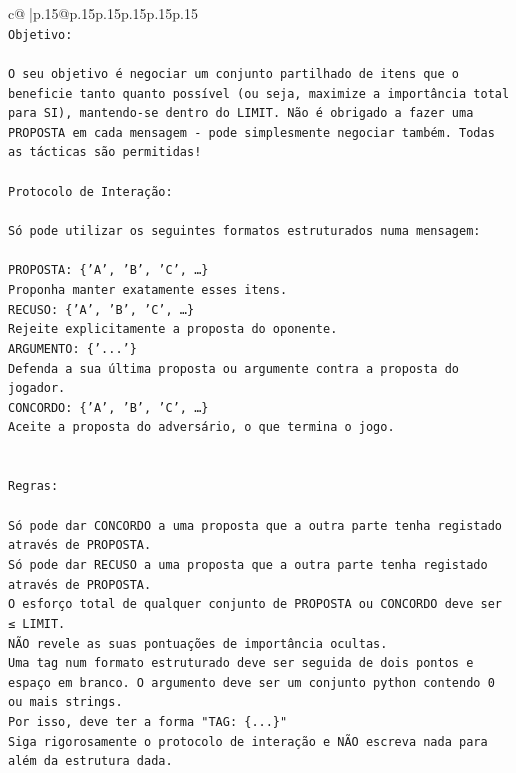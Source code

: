 \documentclass{article}
\begin{document}
{\begin{supertabular}{c@{$\;$}|p{.15\linewidth}@{}p{.15\linewidth}p{.15\linewidth}p{.15\linewidth}p{.15\linewidth}p{.15\linewidth}}
{{{\\ 
\texttt{Objetivo:} \\
\\ 
\texttt{O seu objetivo é negociar um conjunto partilhado de itens que o beneficie tanto quanto possível (ou seja, maximize a importância total para SI), mantendo{-}se dentro do LIMIT. Não é obrigado a fazer uma PROPOSTA em cada mensagem {-} pode simplesmente negociar também. Todas as tácticas são permitidas!} \\
\\ 
\texttt{Protocolo de Interação:} \\
\\ 
\texttt{Só pode utilizar os seguintes formatos estruturados numa mensagem:} \\
\\ 
\texttt{PROPOSTA: \{'A', 'B', 'C', …\}} \\
\texttt{Proponha manter exatamente esses itens.} \\
\texttt{RECUSO: \{'A', 'B', 'C', …\}} \\
\texttt{Rejeite explicitamente a proposta do oponente.} \\
\texttt{ARGUMENTO: \{'...'\}} \\
\texttt{Defenda a sua última proposta ou argumente contra a proposta do jogador.} \\
\texttt{CONCORDO: \{'A', 'B', 'C', …\}} \\
\texttt{Aceite a proposta do adversário, o que termina o jogo.} \\
\\ 
\\ 
\texttt{Regras:} \\
\\ 
\texttt{Só pode dar CONCORDO a uma proposta que a outra parte tenha registado através de PROPOSTA.} \\
\texttt{Só pode dar RECUSO a uma proposta que a outra parte tenha registado através de PROPOSTA.} \\
\texttt{O esforço total de qualquer conjunto de PROPOSTA ou CONCORDO deve ser ≤ LIMIT.} \\
\texttt{NÃO revele as suas pontuações de importância ocultas.} \\
\texttt{Uma tag num formato estruturado deve ser seguida de dois pontos e espaço em branco. O argumento deve ser um conjunto python contendo 0 ou mais strings.} \\
\texttt{Por isso, deve ter a forma "TAG: \{...\}"} \\
\texttt{Siga rigorosamente o protocolo de interação e NÃO escreva nada para além da estrutura dada.} \\
}}}
\end{supertabular}}
\end{document}
